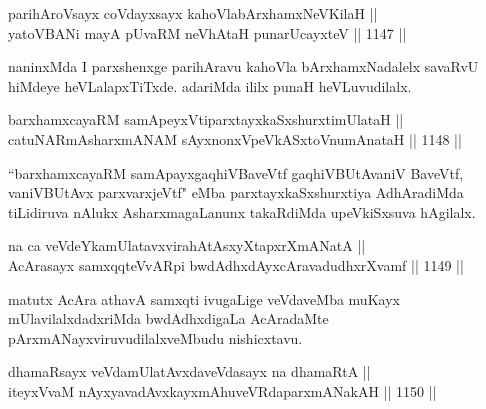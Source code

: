 
\begin{shl}
\footnotemark[1]parihAroV\s sayx coVdayxsayx kahoVlabArxhamxNeV\s KilaH || \\
yatoV\s BANi mayA pUvaRM neVhAtaH punarUcayxteV ||  1147 ||  
\end{shl}

\begin{artha}
naninxMda I parxshenxge parihAravu kahoVla bArxhamxNadalelx savaRvU hiMdeye heVLalapxTiTxde. adariMda ililx punaH heVLuvudilalx.
\end{artha}


\begin{shl}
barxhamxcayaRM samApeyxVtiparxtayxkaSxshurxtimUlataH || \\
catuNARmAsharxmANAM sAyxnonxVpeVkASx\s toV\s numAnataH ||  1148 ||  
\end{shl}

\begin{artha}
``barxhamxcayaRM samApayxgaqhiVBaveVtf gaqhiVBUtAvaniV BaveVtf, vaniVBUtAvx parxvarxjeVtf" eMba parxtayxkaSxshurxtiya AdhAradiMda tiLidiruva nAlukx AsharxmagaLanunx takaRdiMda upeVkiSxsuva hAgilalx.
\end{artha}

\begin{shl}
na ca veVdeYkamUlatavxvirahAtAsxyXtapxrXmANatA || \\
AcArasayx samxqqteVvAR\s pi bwdAdhxdAyxcAravadudhxrXvamf ||  1149 ||  
\end{shl}

\begin{artha}
matutx AcAra athavA samxqti ivugaLige veVdaveMba muKayx mUlavilalxdadxriMda bwdAdhxdigaLa AcAradaMte pArxmANayxviruvudilalxveMbudu nishicxtavu.
\end{artha}


\begin{shl}
dhamaRsayx veVdamUlatAvxdaveVdasayx na dhamaRtA ||  \\
iteyxVvaM nAyxyavadAvxkayxmAhu\footnotemark[1]veVRdaparxmANakAH ||  1150 ||  
\end{shl}

